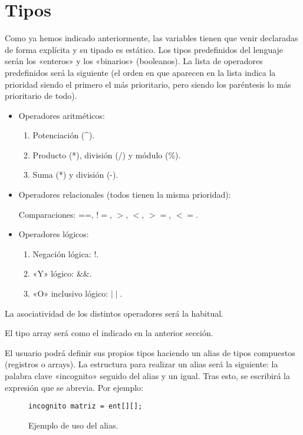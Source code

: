 \section*{Tipos}
Como ya hemos indicado anteriormente, las variables tienen que venir declaradas
de forma explícita y su tipado es estático. Los tipos predefinidos del lenguaje
serán los «enteros» y los «binarios» (booleanos). La lista de operadores
predefinidos será la siguiente (el orden en que aparecen en la lista indica la
prioridad siendo el primero el más prioritario, pero siendo los paréntesis lo
más prioritario de todo).
\begin{itemize}
\item Operadores aritméticos:
    \begin{enumerate}
        \item Potenciación (\^{}).
        \item Producto (*), división (/) y módulo (\%).
        \item Suma (*) y división (-).
    \end{enumerate}
\item Operadores relacionales (todos tienen la misma prioridad):

Comparaciones: ==, $!=$, $>$, $<$, $>=$, $<=$.

\item Operadores lógicos:
\begin{enumerate}
    \item Negación lógica: $!$.
    \item «Y» lógico: \&\&.
    \item «O» inclusivo lógico: $\mid \mid$.
\end{enumerate}
\end{itemize}
La asociatividad de los distintos operadores será la habitual.

El tipo array será como el indicado en la anterior sección.

El usuario podrá definir sus propios tipos haciendo un alias de tipos
compuestos (registros o arrays). La estructura para realizar un alias será la
siguiente: la palabra clave «incognito» seguido del alias y un igual. Tras esto,
se escribirá la expresión que se abrevia. Por ejemplo:
\begin{figure}[H]
    \centering
    \begin{lstlisting}
incognito matriz = ent[][];
    \end{lstlisting}
    \caption{Ejemplo de uso del alias.}
\end{figure}

